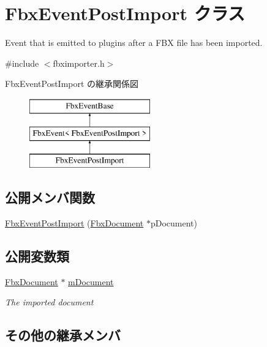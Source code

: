 \hypertarget{class_fbx_event_post_import}{}\section{Fbx\+Event\+Post\+Import クラス}
\label{class_fbx_event_post_import}


Event that is emitted to plugins after a F\+BX file has been imported.  




{\ttfamily \#include $<$fbximporter.\+h$>$}

Fbx\+Event\+Post\+Import の継承関係図\begin{figure}[H]
\begin{center}
\leavevmode
\includegraphics[height=3.000000cm]{class_fbx_event_post_import}
\end{center}
\end{figure}
\subsection*{公開メンバ関数}
\begin{DoxyCompactItemize}
\item 
\hyperlink{class_fbx_event_post_import_aefcd44e6871e671e571f3f378ceab40a}{Fbx\+Event\+Post\+Import} (\hyperlink{class_fbx_document}{Fbx\+Document} $\ast$p\+Document)
\end{DoxyCompactItemize}
\subsection*{公開変数類}
\begin{DoxyCompactItemize}
\item 
\hyperlink{class_fbx_document}{Fbx\+Document} $\ast$ \hyperlink{class_fbx_event_post_import_a9e7d9e8702a8e82a81409d1393845a1a}{m\+Document}
\begin{DoxyCompactList}\small\item\em The imported document \end{DoxyCompactList}\end{DoxyCompactItemize}
\subsection*{その他の継承メンバ}


